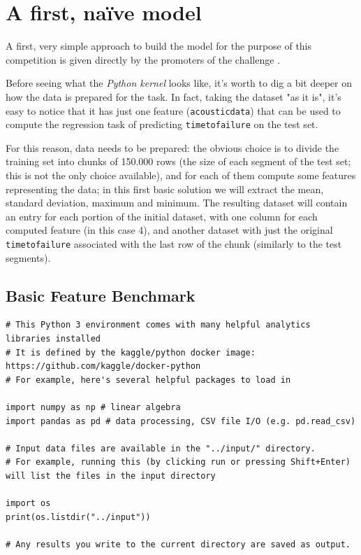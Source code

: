\chapter{A first, na{\"i}ve model}
\label{capitolo2}
\thispagestyle{empty}

\noindent A first, very simple approach to build the model for the purpose of this competition is given directly by the promoters of the challenge \cite{kernelinit}.

\bigbreak

Before seeing what the \textit{Python kernel} looks like, it's worth to dig a bit deeper on how the data is prepared for the task. In fact, taking the dataset "as it is", it's easy to notice that it has just one feature (\texttt{acoustic\textunderscore data}) that can be used to compute the regression task of predicting \texttt{time\textunderscore to\textunderscore failure} on the test set.

For this reason, data needs to be prepared: the obvious choice is to divide the training set into chunks of 150.000 rows (the size of each segment of the test set; this is not the only choice available), and for each of them compute some features representing the data; in this first basic solution we will extract the mean, standard deviation, maximum and minimum. The resulting dataset will contain an entry for each portion of the initial dataset, with one column for each computed feature (in this case 4), and another dataset with just the original \texttt{time\textunderscore to\textunderscore failure} associated with the last row of the chunk (similarly to the test segments).

\section{Basic Feature Benchmark}
\begin{lstlisting}
# This Python 3 environment comes with many helpful analytics libraries installed
# It is defined by the kaggle/python docker image: https://github.com/kaggle/docker-python
# For example, here's several helpful packages to load in 

import numpy as np # linear algebra
import pandas as pd # data processing, CSV file I/O (e.g. pd.read_csv)

# Input data files are available in the "../input/" directory.
# For example, running this (by clicking run or pressing Shift+Enter) will list the files in the input directory

import os
print(os.listdir("../input"))

# Any results you write to the current directory are saved as output.
\end{lstlisting}

